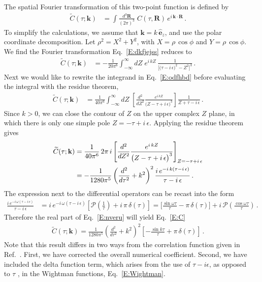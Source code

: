 \documentclass[preprint,prd,showpacs,superscriptaddress]{revtex4}
\begin{document}
The spatial Fourier transformation of this two-point function is defined by
\begin{align}\label{E:dkfjejss}
	\widetilde{C}(\tau;\mathbf{k})&=\int\frac{d^{3}\mathbf{R}}{(2\pi)^{3}}\;C(\tau,\mathbf{R})\,e^{i\,\mathbf{k}\cdot\mathbf{R}}\,.
\end{align}
To simplify the calculations, we assume that $\mathbf{k}=k\,\hat{\mathbf{e}}_{z}$, and use the polar coordinate decomposition. Let 
$\rho^{2}=X^{2}+Y^{2}$, with $X=\rho\, \cos\phi$ and $Y=\rho\, \cos\phi$. We find the Fourier transformation Eq.~\eqref{E:dkfjejss} reduces to
\begin{align}
	\widetilde{C}(\tau;\mathbf{k})&=-\frac{1}{20\pi^{6}}\int_{-\infty}^{\infty}\!dZ\;e^{i\,k Z}\,
	\frac{1}{\bigl[\bigl(\tau-i\,\epsilon\bigr)^{2}-Z^{2}\bigr]^{3}}\,.\label{E:odfhbd}
\end{align}
Next we would like to rewrite the integrand in Eq.~\eqref{E:odfhbd} before evaluating the integral with the residue theorem,
\begin{align}
	\widetilde{C}(\tau;\mathbf{k})&=\frac{1}{40\pi^{6}}\int_{-\infty}^{\infty}\!dZ\;\left[\frac{d^{2}}{dZ^{2}}\frac{e^{i\,k Z}}
	{\bigl(Z-\tau+i\,\epsilon\bigr)^{3}}\right]\frac{1}{Z+\tau-i\,\epsilon}\,.
\end{align}
Since $k>0$, we can close the contour of $Z$ on the upper complex $Z$ plane, in which there is only one simple pole $Z=-\tau+i\,\epsilon$. 
Applying the residue theorem gives 
\begin{align}
	\widetilde{C}(\tau;\mathbf{k})&=\frac{1}{40\pi^{6}}\,2\pi\,i 
	\left[ \frac{d^{2}}{dZ^{2}}\frac{e^{i\,k Z}}{\bigl(Z-\tau+i\,\epsilon\bigr)^{3}}\right]_{Z=-\tau+i\,\epsilon}
	\notag\\
	&=-\frac{1}{1280\pi^{5}}\left(\frac{d^{2}}{d\tau^{2}}+k^{2}\right)^{2}\frac{i\,e^{-i\,k(\tau-i\,\epsilon)}}{\tau-i\,\epsilon}\,.\label{E:nveru}
\end{align}
The expression next to the differential operators can be recast into the form
\begin{align}
	\frac{i\,e^{-i\,\omega(\tau-i\,\epsilon)}}{\tau-i\,\epsilon}&=i\,e^{-i\,\omega(\tau-i\,\epsilon)}
	\left[\mathcal{P}\left(\frac{1}{\tau}\right)+
	i\,\pi\,\delta(\tau)\right]=\biggl[\frac{\sin\omega\tau}{\tau}-\pi\,\delta(\tau)\biggr]+i\,\mathcal{P}\left(\frac{\cos\omega\tau}{\tau}\right)\,.
\end{align}
Therefore the real part of Eq.~\eqref{E:nveru} will yield Eq.~\eqref{E:C}
\begin{align}
	\widetilde{C}(\tau;\mathbf{k})=\frac{1}{1280\pi^{5}}\left(\frac{d^{2}}{d\tau^{2}}+k^{2}\right)^{2}\left[-\frac{\sin k\tau}{\tau}+\pi\,\delta(\tau)\right]\,.
\end{align}
Note that this result differs in two ways from the correlation function given in Ref.~\cite{WHFN11}. First, we have corrected the overall numerical
coefficient. Second, we have included the delta function term, which arises from the use of $\tau -i \epsilon$, as opposed to $\tau$ , in the
Wightman functions, Eq.~\eqref{E:Wightman}.
\end{document}
